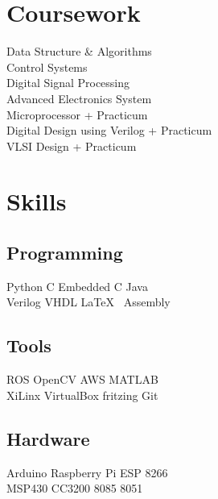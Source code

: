 \documentclass[]{deedy-resume-openfont}
\begin{document}
\begin{minipage}[t]{0.33\textwidth}

\section{Coursework}

Data Structure \& Algorithms \\
Control Systems \\
Digital Signal Processing \\
Advanced Electronics System \\
Microprocessor + Practicum \\
Digital Design using Verilog + Practicum \\
VLSI Design + Practicum \\
\sectionsep


\section{Skills}
\subsection{Programming}
Python \textbullet{} C \textbullet{} Embedded C \textbullet{} Java \\
Verilog \textbullet{} VHDL \textbullet{} \LaTeX\ \textbullet{} Assembly
\sectionsep

\subsection{Tools}
ROS \textbullet{} OpenCV \textbullet{} AWS \textbullet{} MATLAB \\
XiLinx \textbullet{} VirtualBox \textbullet{} fritzing \textbullet{} Git \\
\sectionsep


\subsection{Hardware}
Arduino \textbullet{} Raspberry Pi \textbullet{} ESP 8266 \\
MSP430 \textbullet{} CC3200 \textbullet{} 8085 \textbullet{} 8051
\sectionsep



\end{minipage}
\end{document}

